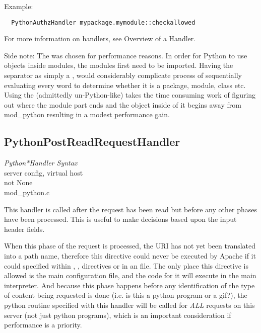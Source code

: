Example: 

\begin{verbatim}
  PythonAuthzHandler mypackage.mymodule::checkallowed
\end{verbatim}

For more information on handlers, see Overview of a Handler.

Side note: The \samp{::} was chosen for performance reasons. In order for
Python to use objects inside modules, the modules first need to be
imported. Having the separator as simply a , would considerably
complicate process of sequentially evaluating every word to determine
whether it is a package, module, class etc. Using the (admittedly
un-Python-like) \samp{::} takes the time consuming work of figuring out
where the module part ends and the object inside of it begins away
from mod_python resulting in a modest performance gain.

\subsection{PythonPostReadRequestHandler\label{dir-handlers-prrh}}

\emph{Python*Handler Syntax}\\
server config, virtual host\\
not None\\
mod_python.c

This handler is called after the request has been read but before any
other phases have been processed. This is useful to make decisions
based upon the input header fields.

\begin{notice}
When this phase of the request is processed, the URI has not yet
been translated into a path name, therefore this directive could never
be executed by Apache if it could specified within ,
,  directives or in an 
file. The only place this directive is allowed is the main
configuration file, and the code for it will execute in the main
interpreter. And because this phase happens before any identification
of the type of content being requested is done (i.e. is this a python
program or a gif?), the python routine specified with this handler
will be called for \emph{ALL} requests on this server (not just python
programs), which is an important consideration if performance is a
priority.
\end{notice}

